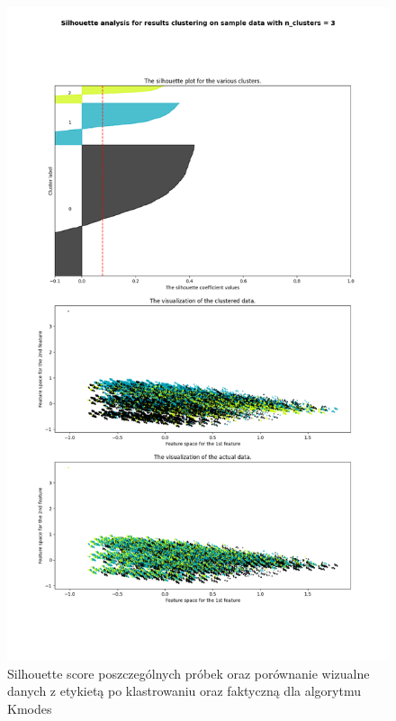 \documentclass{classrep}
\begin{document}
{{{                 \begin{figure}[!htbp]
                    \centering
                    \includegraphics[width=1\textwidth]{img/clustering/kmodes_silhouette.png}
                    \caption{Silhouette score poszczególnych próbek oraz porównanie wizualne danych z etykietą po klastrowaniu oraz faktyczną dla algorytmu Kmodes}
                    \label{silh_kmodes}
                \end{figure}
                \FloatBarrier
            }

}}
\end{document}
